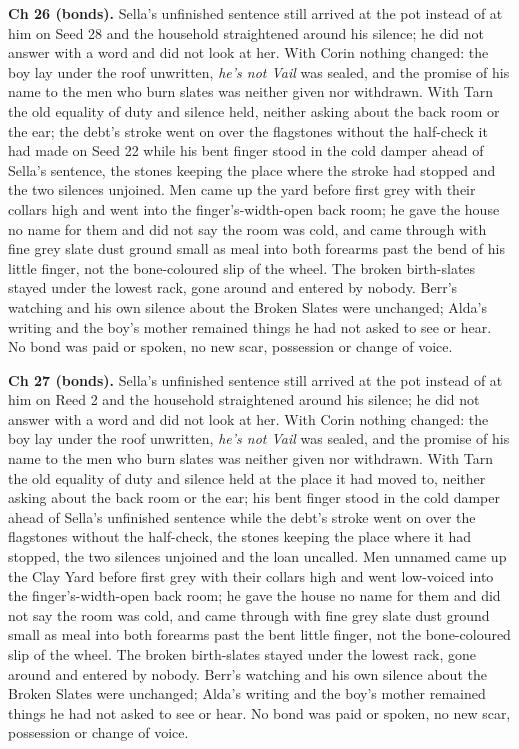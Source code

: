 \documentclass{design/chronicle}
\begin{document}
{\textbf{Ch 26 (bonds).} Sella’s unfinished sentence still arrived at the pot instead of at him on Seed 28 and the household straightened around his silence; he did not answer with a word and did not look at her. With Corin nothing changed: the boy lay under the roof unwritten, \emph{he’s not Vail} was sealed, and the promise of his name to the men who burn slates was neither given nor withdrawn. With Tarn the old equality of duty and silence held, neither asking about the back room or the ear; the debt’s stroke went on over the flagstones without the half-check it had made on Seed 22 while his bent finger stood in the cold damper ahead of Sella’s sentence, the stones keeping the place where the stroke had stopped and the two silences unjoined. Men came up the yard before first grey with their collars high and went into the finger’s-width-open back room; he gave the house no name for them and did not say the room was cold, and came through with fine grey slate dust ground small as meal into both forearms past the bend of his little finger, not the bone-coloured slip of the wheel. The broken birth-slates stayed under the lowest rack, gone around and entered by nobody. Berr’s watching and his own silence about the Broken Slates were unchanged; Alda’s writing and the boy’s mother remained things he had not asked to see or hear. No bond was paid or spoken, no new scar, possession or change of voice.

\textbf{Ch 27 (bonds).} Sella’s unfinished sentence still arrived at the pot instead of at him on Reed 2 and the household straightened around his silence; he did not answer with a word and did not look at her. With Corin nothing changed: the boy lay under the roof unwritten, \emph{he’s not Vail} was sealed, and the promise of his name to the men who burn slates was neither given nor withdrawn. With Tarn the old equality of duty and silence held at the place it had moved to, neither asking about the back room or the ear; his bent finger stood in the cold damper ahead of Sella’s unfinished sentence while the debt’s stroke went on over the flagstones without the half-check, the stones keeping the place where it had stopped, the two silences unjoined and the loan uncalled. Men unnamed came up the Clay Yard before first grey with their collars high and went low-voiced into the finger’s-width-open back room; he gave the house no name for them and did not say the room was cold, and came through with fine grey slate dust ground small as meal into both forearms past the bent little finger, not the bone-coloured slip of the wheel. The broken birth-slates stayed under the lowest rack, gone around and entered by nobody. Berr’s watching and his own silence about the Broken Slates were unchanged; Alda’s writing and the boy’s mother remained things he had not asked to see or hear. No bond was paid or spoken, no new scar, possession or change of voice.

}
\end{document}
